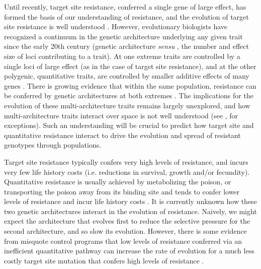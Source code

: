 \documentclass[10pt,letterpaper]{article}
\begin{document}
Until recently, target site resistance, conferred a single gene of large effect, has formed the basis of our understanding of resistance, and the evolution of target site resistance is well understood \cite{Neve2007}. However, evolutionary biologists have recognized a continuum in the genetic architecture underlying any given trait since the early 20th century (genetic architecture \textit{sensu} \cite{Deba2015}, the number and effect size of loci contributing to a trait). At one extreme traits are controlled by a single loci of large effect (as in the case of target site resistance), and at the other polygenic, quantitative traits, are controlled by smaller additive effects of many genes \cite{Land1989, Mack2009, Rajo2013}. There is growing evidence that within the same population, resistance can be conferred by genetic architectures at both extremes \cite{Donn2009, Bing2011, Hend2013, Oake2013, Bauc2016}. The implications for the evolution of these multi-architecture traits remains largely unexplored, and how multi-architecture traits interact over space is not well understood (see \cite{Deba2015}, \cite{Yeam2015} for exceptions). Such an understanding will be crucial to predict how target site and quantitative resistance interact to drive the evolution and spread of resistant genotypes through populations.

Target site resistance typically confers very high levels of resistance, and incurs very few life history costs (i.e. reductions in survival, growth and/or fecundity). Quantitative resistance is usually achieved by metabolizing the poison, or transporting the poison away from its binding site \cite{Bauc2016} and tends to confer lower levels of resistance and incur life history costs \cite{Bauc2016}. It is currently unknown how these two genetic architectures interact in the evolution of resistance. Naively, we might expect the architecture that evolves first to reduce the selective pressure for the second architecture, and so slow its evolution. However, there is some evidence from misquote control programs that low levels of resistance conferred via an inefficient quantitative pathway can increase the rate of evolution for a much less costly target site mutation that confers high levels of resistance \cite{Vera2015}.
\end{document}
